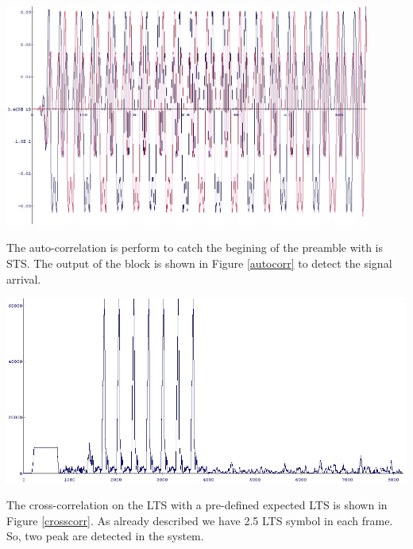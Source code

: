\begin{center}
\includegraphics[width=12cm]{content/fig/sts_chipscope.JPG}
\label{sts_chipscope}
\end{center}

The auto-correlation is perform to catch the begining of the preamble with is STS. The output of the block is shown in Figure \ref{autocorr} to detect the signal arrival.\\

\begin{center}
\includegraphics[width=\textwidth]{content/fig/autocorr.JPG}
\label{autocorr}
\end{center}

The cross-correlation on the LTS with a pre-defined expected LTS is shown in Figure \ref{crosscorr}. As already described we have 2.5 LTS symbol in each frame. So, two peak are detected in the system.\\

